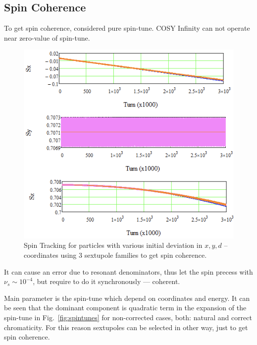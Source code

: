 \documentclass[a4paper,
               keeplastbox,   %
               ]{jacow}
\begin{document}
\subsection{Spin Coherence}

\par To get spin coherence, considered pure spin-tune. COSY Infinity can not operate near zero-value of spin-tune.

\begin{figure}[!hb]
   \centering
   \includegraphics*[width=0.952\columnwidth]{img/MOPA070_f4-1}
   \caption{Spin Tracking for particles with various initial deviation in $x, y, d$ – coordinates using 3 sextupole families to get spin coherence.}
   \label{fig:STcoherence}
\end{figure}

It can cause an error due to resonant denominators, thus let the spin precess with $\nu_{s}\sim10^{-4}$, but require to do it synchronously — coherent.

Main parameter is the spin-tune which depend on coordinates and energy. It can be seen that the dominant component is quadratic term in the expansion of the spin-tune in Fig.~\ref{fig:spintunes} for non-corrected cases, both: natural and correct chromaticity. For this reason sextupoles can be selected in other way, just to get spin coherence.
\end{document}
